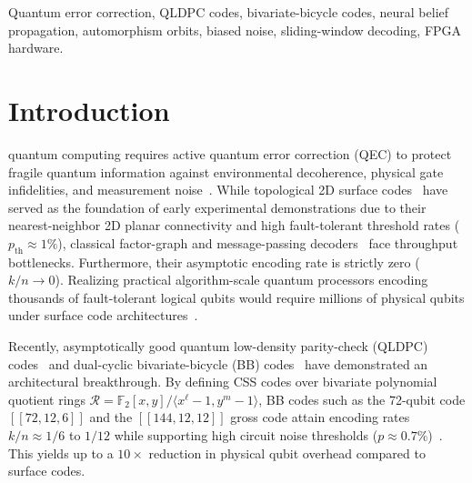 \documentclass[journal]{IEEEtran}
\begin{document}
\begin{IEEEkeywords}
Quantum error correction, QLDPC codes, bivariate-bicycle codes, neural belief propagation, automorphism orbits, biased noise, sliding-window decoding, FPGA hardware.
\end{IEEEkeywords}

\section{Introduction}
 quantum computing requires active quantum error correction (QEC) to protect fragile quantum information against environmental decoherence, physical gate infidelities, and measurement noise~\cite{dennis2002topological,fowler2012surface}. While topological 2D surface codes~\cite{dennis2002topological,fowler2012surface,delfosse2021almost,litinski2019game} have served as the foundation of early experimental demonstrations due to their nearest-neighbor 2D planar connectivity and high fault-tolerant threshold rates ($p_{\text{th}} \approx 1\%$), classical factor-graph and message-passing decoders~\cite{richardson2001capacity,mackay1996near,kschischang2001factor} face throughput bottlenecks. Furthermore, their asymptotic encoding rate is strictly zero ($k/n \to 0$). Realizing practical algorithm-scale quantum processors encoding thousands of fault-tolerant logical qubits would require millions of physical qubits under surface code architectures~\cite{bravyi2024high}.

Recently, asymptotically good quantum low-density parity-check (QLDPC) codes~\cite{panteleev2021degenerate} and dual-cyclic bivariate-bicycle (BB) codes~\cite{bravyi2024high,bravyi2024circuits,rabeti2025list,basak2026hierarchical} have demonstrated an architectural breakthrough. By defining CSS codes over bivariate polynomial quotient rings $\mathcal{R} = \mathbb{F}_2[x, y] / \langle x^\ell - 1, y^m - 1 \rangle$, BB codes such as the 72-qubit code $[[72, 12, 6]]$ and the $[[144, 12, 12]]$ gross code attain encoding rates $k/n \approx 1/6$ to $1/12$ while supporting high circuit noise thresholds ($p \approx 0.7\%$)~\cite{bravyi2024high}. This yields up to a $10\times$ reduction in physical qubit overhead compared to surface codes.
\end{document}
